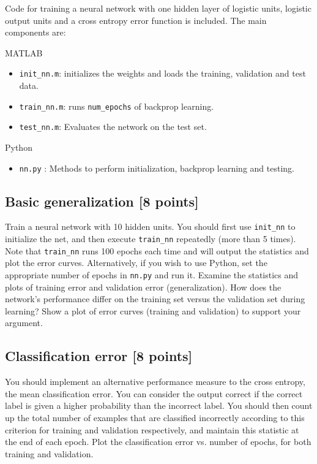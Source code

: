 \documentclass[12pt]{article}
\begin{document}
Code for training a neural network with one hidden layer of logistic units,
logistic output units and a cross entropy error function is included. The main components are:

MATLAB
\begin{itemize}
\item {\tt init\_nn.m}: initializes the weights and loads the training, validation and test data.
\item {\tt train\_nn.m}: runs {\tt num\_epochs} of backprop learning.
\item {\tt test\_nn.m}: Evaluates the network on the test set.
\end{itemize}

Python
\begin{itemize}
\item {\tt nn.py} : Methods to perform initialization, backprop learning and
  testing.
\end{itemize}

\subsection{Basic generalization [8 points]}

Train a neural network with 10 hidden units. You should
first use {\tt init\_nn} to initialize the net, and then execute {\tt train\_nn}
repeatedly (more than 5 times). Note that {\tt train\_nn} runs 100 epochs each
time and will output the statistics and plot the error curves. Alternatively, if
you wish to use Python, set the appropriate number of epochs in {\tt nn.py} and
run it. Examine the statistics and plots of training error and validation error (generalization).
How does the network's performance differ on the training set versus the validation set
during learning? Show a plot of error curves (training and validation) to support your argument.

\subsection{Classification error [8 points]}

You should implement an alternative performance measure to the cross entropy, the mean
classification error. You can
consider the output correct if the correct label is given a higher probability
than the incorrect label.  You should then count up the total number of
examples that are classified incorrectly according to this criterion for
training and validation respectively, and maintain this statistic at the end of
each epoch. Plot the classification error vs. number of epochs, for both
training and validation.
\end{document}
